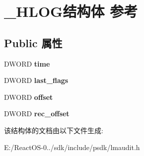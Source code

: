 \hypertarget{struct___h_l_o_g}{}\section{\+\_\+\+H\+L\+O\+G结构体 参考}
\label{struct___h_l_o_g}
\subsection*{Public 属性}
\begin{DoxyCompactItemize}
\item 
\mbox{\label{struct___h_l_o_g_af57486f2877dcb76d350c858150e53d6}} 
D\+W\+O\+RD {\bfseries time}
\item 
\mbox{\label{struct___h_l_o_g_acc9b349f9919c1eb0916b8ea49a81c1d}} 
D\+W\+O\+RD {\bfseries last\+\_\+flags}
\item 
\mbox{\label{struct___h_l_o_g_a8e0313699dbe99f7c33bb87c91582116}} 
D\+W\+O\+RD {\bfseries offset}
\item 
\mbox{\label{struct___h_l_o_g_a059ffb409f8bc669b36b98c125d56641}} 
D\+W\+O\+RD {\bfseries rec\+\_\+offset}
\end{DoxyCompactItemize}


该结构体的文档由以下文件生成\+:\begin{DoxyCompactItemize}
\item 
E\+:/\+React\+O\+S-\/0../sdk/include/psdk/lmaudit.\+h\end{DoxyCompactItemize}
